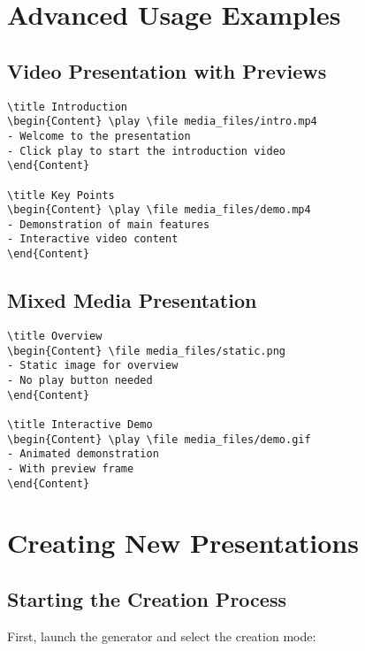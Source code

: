 \documentclass{article}
\begin{document}
\section{Advanced Usage Examples}
\subsection{Video Presentation with Previews}
\begin{tcolorbox}[title=Example: Video Slides]
\begin{verbatim}
\title Introduction
\begin{Content} \play \file media_files/intro.mp4
- Welcome to the presentation
- Click play to start the introduction video
\end{Content}

\title Key Points
\begin{Content} \play \file media_files/demo.mp4
- Demonstration of main features
- Interactive video content
\end{Content}
\end{verbatim}
\end{tcolorbox}

\subsection{Mixed Media Presentation}
\begin{tcolorbox}[title=Example: Mixed Media]
\begin{verbatim}
\title Overview
\begin{Content} \file media_files/static.png
- Static image for overview
- No play button needed
\end{Content}

\title Interactive Demo
\begin{Content} \play \file media_files/demo.gif
- Animated demonstration
- With preview frame
\end{Content}
\end{verbatim}
\end{tcolorbox}
\section{Creating New Presentations}

\subsection{Starting the Creation Process}
First, launch the generator and select the creation mode:
\end{document}
